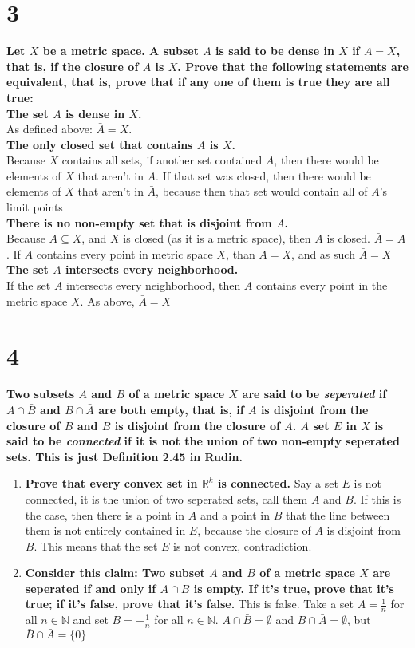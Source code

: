 \documentclass{article}
\begin{document}
\section* {3}
\noindent \textbf{Let $X$ be a metric space. A subset $A$ is said to be dense in $X$ if $\bar{A} = X$, that is, if the closure of $A$ is $X$. Prove that the following statements are equivalent, that is, prove that if any one of them is true they are all true:} \\
\textbf{The set $A$ is dense in $X$.}\\
As defined above: $\bar{A} = X$.\\
\textbf{The only closed set that contains $A$ is $X$.}\\
Because $X$ contains all sets, if another set contained $A$, then there would be elements of $X$ that aren't in $A$. If that set was closed, then there would be elements of $X$ that aren't in $\bar{A}$, because then that set would contain all of $A$'s limit points\\ 
\textbf{There is no non-empty set that is disjoint from $A$.}\\
Because $A \subseteq X$, and $X$ is closed (as it is a metric space), then $A$ is closed. $\bar{A} = A$. If $A$ contains every point in metric space $X$, than $A = X$, and as such $\bar{A} = X$\\
\textbf{The set $A$ intersects every neighborhood.}\\
If the set $A$ intersects every neighborhood, then $A$ contains every point in the metric space $X$. As above, $\bar{A} = X$
\section* {4}
\noindent \textbf{Two subsets $A$ and $B$ of a metric space $X$ are said to be \emph{seperated} if $A \cap \bar{B}$ and $B \cap \bar{A}$ are both empty, that is, if $A$ is disjoint from the closure of $B$ and $B$ is disjoint from the closure of $A$. $A$ set $E$ in $X$ is said to be \emph{connected} if it is not the union of two non-empty seperated sets. This is just Definition 2.45 in Rudin.}
\begin{enumerate}[label=\textbf{\alph*)}]
    \item \textbf{Prove that every convex set in $\mathbb{R}^k$ is connected.}
    Say a set $E$ is not connected, it is the union of two seperated sets, call them $A$ and $B$. If this is the case, then there is a point in $A$ and a point in $B$ that the line between them is not entirely contained in $E$, because the closure of $A$ is disjoint from $B$. This means that the set $E$ is not convex, contradiction.
    \item \textbf{Consider this claim: Two subset $A$ and $B$ of a metric space $X$ are seperated if and only if $\bar{A} \cap \bar{B}$ is empty. If it's true, prove that it's true; if it's false, prove that it's false.}
    This is false. Take a set $A = \frac{1}{n}$ for all $n \in \mathbb{N}$ and set $B = -\frac{1}{n}$ for all $n \in \mathbb{N}$.  $A \cap \bar{B} = \emptyset$ and $B \cap \bar{A} = \emptyset$, but $\bar{B} \cap \bar{A} = \{0\}$
\end{enumerate}
\end{document}
